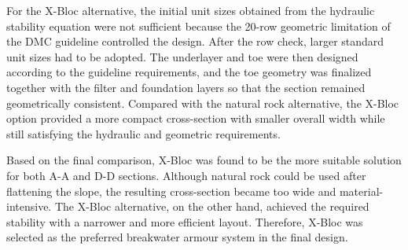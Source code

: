 \documentclass[a4paper, 11pt]{article}
\begin{document}
For the X-Bloc alternative, the initial unit sizes obtained from the hydraulic stability equation were not sufficient because the 20-row geometric limitation of the DMC guideline controlled the design. After the row check, larger standard unit sizes had to be adopted. The underlayer and toe were then designed according to the guideline requirements, and the toe geometry was finalized together with the filter and foundation layers so that the section remained geometrically consistent. Compared with the natural rock alternative, the X-Bloc option provided a more compact cross-section with smaller overall width while still satisfying the hydraulic and geometric requirements.

Based on the final comparison, X-Bloc was found to be the more suitable solution for both A-A and D-D sections. Although natural rock could be used after flattening the slope, the resulting cross-section became too wide and material-intensive. The X-Bloc alternative, on the other hand, achieved the required stability with a narrower and more efficient layout. Therefore, X-Bloc was selected as the preferred breakwater armour system in the final design.

\newpage

\end{document}
